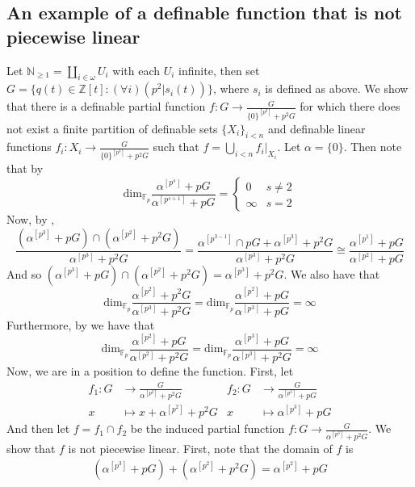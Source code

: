 \documentclass[a4paper,11pt]{article}
\newenvironment{claimproof}{\renewcommand{\qedsymbol}{$\blacksquare$}\proof} {\endproof} %
\newcommand{\tx}{\textrm}
\renewcommand{\dim}{\tx{dim}}
\begin{document}
\subsection{An example of a definable function that is not piecewise linear}
Let $\mathbb{N}_{\geq 1} = \coprod\limits_{i\in\omega} U_i$ with each $U_i$
infinite, then set $G = \{q(t)\in \mathbb{Z}[t] : (\forall i)( p^2 | 
s_i(t))\}$, where $s_i$ is defined as above. We show that there is a definable
partial function $f:G\rightarrow \frac{G}{\{0\}^{[p^3]}+p^2G}$ for which there
does not exist a finite partition of definable sets $\{X_i\}_{i< n}$ and
definable linear functions $f_i:X_i\rightarrow \frac{G}{\{0\}^{[p^3]}+p^2G}$
such that $f = \bigcup\limits_{i < n} f_i|_{X_i}$.
\begin{claimproof}
	Let $\alpha = \{0\}$. Then note that by 
	\[ \dim_{\mathbb{F}_p}\frac{\alpha^{[p^s]}+pG}{\alpha^{[p^{s+1}]}+pG} = 
    \begin{cases}
		0 & s\neq 2 \\
		\infty & s = 2 
	\end{cases}
	\]
	Now, by , \[
	\frac{(\alpha^{[p^3]}+pG)\cap(\alpha^{[p^2]}+p^2G)}{\alpha^{[p^3]}+p^2G} = 
    \frac{\alpha^{[p^{3-1}]}\cap pG+\alpha^{[p^3]}+p^2G}{\alpha^{[p^3]}+p^2G} 
    \cong \frac{\alpha^{[p^1]}+pG}{\alpha^{[p^2]}+pG}
	\]
	And so $(\alpha^{[p^3]}+pG)\cap(\alpha^{[p^2]}+p^2G) = 
    \alpha^{[p^3]}+p^2G$. We also have that \[\dim_{\mathbb{F}
    _p}\frac{\alpha^{[p^2]}+p^2G}{\alpha^{[p^3]}+p^2G} = \dim_{\mathbb{F}
    _p}\frac{\alpha^{[p^2]}+pG}{\alpha^{[p^3]}+pG} = \infty\]
	Furthermore, by  we have that \[ 
    \dim_{\mathbb{F}_p} \frac{\alpha^{[p^2]}+pG}{\alpha^{[p^2]}+p^2G} = 
    \dim_{\mathbb{F}_p}\frac{\alpha^{[p^3]}+pG}{\alpha^{[p^3]}+p^2G} = \infty\]
	Now, we are in a position to define the function. First, let
	\begin{align*}
		f_1:G&\rightarrow\frac{G}{\alpha^{[p^2]}+p^2G} & f_2:G&\rightarrow\frac{G}{\alpha^{[p^3]}+pG}\\
		x&\mapsto x+\alpha^{[p^2]}+p^2G &x&\mapsto \alpha^{[p^3]}+pG
	\end{align*}
	And then let $f= f_1\cap f_2$ be the induced partial function
    $f:G\rightarrow \frac{G}{\alpha^{[p^3]}+p^2G}$. We show that $f$ is not
    piecewise linear. First, note that the domain of $f$ is \begin{align*}
        (\alpha^{[p^3]}+pG) + (\alpha^{[p^2]}+p^2G) = \alpha^{[p^2]}+pG
    \end{align*}

\end{claimproof}
\end{document}
